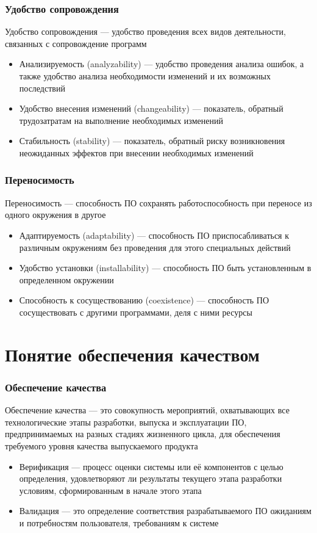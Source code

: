 \documentclass{../industrial-development}
\begin{document}
	\begin{frame} \frametitle {Удобство сопровождения}
		\begin{block}{}
			\alert{Удобство сопровождения} --- удобство проведения всех видов деятельности, связанных с сопровождение программ
		\end{block}
		\begin{itemize}
			\item Анализируемость (analyzability) --- удобство проведения анализа ошибок, а также удобство анализа необходимости изменений и их возможных последствий
			\item Удобство внесения изменений (changeability) --- показатель, обратный трудозатратам на выполнение необходимых изменений
			\item Стабильность (stability) --- показатель, обратный риску возникновения неожиданных эффектов при внесении необходимых изменений
		\end{itemize}
	\end{frame}	
	
	\begin{frame} \frametitle {Переносимость}
		\begin{block}{}
			\alert{Переносимость} --- способность ПО сохранять работоспособность при переносе из одного окружения в другое
		\end{block}
		\begin{itemize}
			\item Адаптируемость (adaptability) --- способность ПО приспосабливаться к различным окружениям без проведения для этого специальных действий
			\item Удобство установки (installability) --- способность ПО быть установленным в определенном окружении
			\item Способность к сосуществованию (coexistence) --- способность ПО сосуществовать с другими программами, деля с ними ресурсы
		\end{itemize}
	\end{frame}	
	
	\section{Понятие обеспечения качеством}
	\begin{frame} \frametitle {Обеспечение качества}
		\begin{block}{}
			\alert{Обеспечение качества} --- это совокупность мероприятий, охватывающих все технологические этапы разработки, выпуска и эксплуатации ПО, предпринимаемых на разных стадиях жизненного цикла, для обеспечения требуемого уровня качества выпускаемого продукта	
		\end{block}
		\begin{itemize}
			\item Верификация --- процесс оценки системы или её компонентов с целью определения, удовлетворяют ли результаты текущего этапа разработки условиям, сформированным в начале этого этапа
			\item Валидация --- это определение соответствия разрабатываемого ПО ожиданиям и потребностям пользователя, требованиям к системе
		\end{itemize}
	\end{frame}	
	
\end{document}
